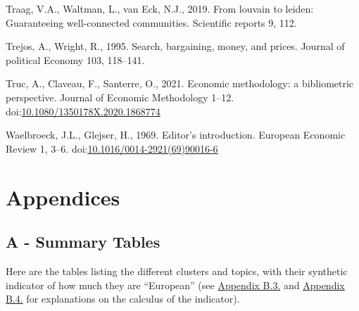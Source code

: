 \documentclass[
  12pt,
  onecolumn]{article}
\newlength{\cslhangindent}
\newlength{\cslentryspacingunit} %
\newenvironment{CSLReferences}[2] %
 {%
  \setlength{\parindent}{0pt}
  \ifodd #1
  \let\oldpar\par
  \def\par{\hangindent=\cslhangindent\oldpar}
  \fi
  \setlength{\parskip}{#2\cslentryspacingunit}
 }%
 {}
\begin{document}
\begin{CSLReferences}{1}{0}
\leavevmode{}%
Traag, V.A., Waltman, L., van Eck, N.J., 2019. From louvain to leiden:
Guaranteeing well-connected communities. Scientific reports 9, 112.

\leavevmode{}%
Trejos, A., Wright, R., 1995. Search, bargaining, money, and prices.
Journal of political Economy 103, 118--141.

\leavevmode{}%
Truc, A., Claveau, F., Santerre, O., 2021. Economic methodology: a
bibliometric perspective. Journal of Economic Methodology 1--12.
doi:\href{https://doi.org/10.1080/1350178X.2020.1868774}{10.1080/1350178X.2020.1868774}

\leavevmode{}%
Waelbroeck, J.L., Glejser, H., 1969. Editor's introduction. European
Economic Review 1, 3--6.
doi:\href{https://doi.org/10.1016/0014-2921(69)90016-6}{10.1016/0014-2921(69)90016-6}

\end{CSLReferences}

\newpage

\hypertarget{appendices}{%
\section*{Appendices}\label{appendices}}

\hypertarget{a---summary-tables}{%
\subsection*{A - Summary Tables}\label{a---summary-tables}}

Here are the tables listing the different clusters and topics, with
their synthetic indicator of how much they are ``European'' (see
\protect\hyperlink{network}{Appendix B.3.} and
\protect\hyperlink{topic}{Appendix B.4.} for explanations on the
calculus of the indicator).
\end{document}
